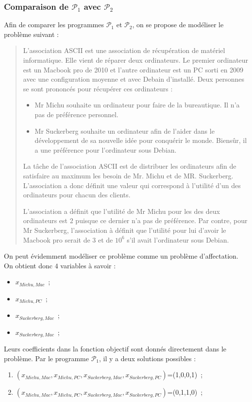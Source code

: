 \documentclass[a4paper, titlepage, oneside, 12pt]{article}%
\begin{document}
\subsubsection{Comparaison de $\mathcal{P}_1$ avec $\mathcal{P}_2$}

Afin de comparer les programmes $\mathcal{P}_1$ et $\mathcal{P}_2$, on se propose de modéliser le problème suivant :
\begin{quote}
L'association ASCII est une association de récupération de matériel informatique. Elle vient de réparer deux ordinateurs. Le premier ordinateur est un Macbook pro de 2010 et l'autre ordinateur est un PC sorti en 2009 avec une configuration moyenne et avec Debain d'installé. Deux personnes se sont prononcés pour récupérer ces ordinateurs :
\begin{itemize}
\item Mr Michu souhaite un ordinateur pour faire de la bureautique. Il n'a pas de préférence personnel.
\item Mr Suckerberg souhaite un ordinateur afin de l'aider dans le développement de sa nouvelle idée pour conquérir le monde. Biensûr, il a une préférence pour l'ordinateur sous Debian.
\end{itemize}

La tâche de l'association ASCII est de distribuer les ordinateurs afin de satisfaire au maximum les besoin de Mr. Michu et de MR. Suckerberg. L'association a donc définit une valeur qui correspond à l'utilité d'un des ordinateurs pour chacun des clients.

L'association a définit que l'utilité de Mr Michu pour les des deux ordinateurs est $2$ puisque ce dernier n'a pas de préférence.
Par contre, pour Mr Suckerberg, l'association à définit que l'utilité pour lui d'avoir le Macbook pro serait de $3$ et de $10^6$ s'il avait l'ordinateur sous Debian. 
\end{quote}

On peut évidemment modéliser ce problème comme un problème d'affectation. On obtient donc $4$ variables à savoir :
\begin{itemize}
\item $x_{Michu, Mac}$~;
\item $x_{Michu, PC}$~;
\item $x_{Suckerberg, Mac}$~;
\item $x_{Suckerberg, Mac}$~;
\end{itemize}

Leurs coefficients dans la fonction objectif sont donnés directement dans le problème. Par le programme $\mathcal{P}_1$, il y a deux solutions possibles : 
\begin{enumerate}
\item $(x_{Michu, Mac},x_{Michu, PC},x_{Suckerberg, Mac},x_{Suckerberg, PC})$=(1,0,0,1)~;
\item $(x_{Michu, Mac},x_{Michu, PC},x_{Suckerberg, Mac},x_{Suckerberg, PC})$=(0,1,1,0)~;
\end{enumerate}
\end{document}
